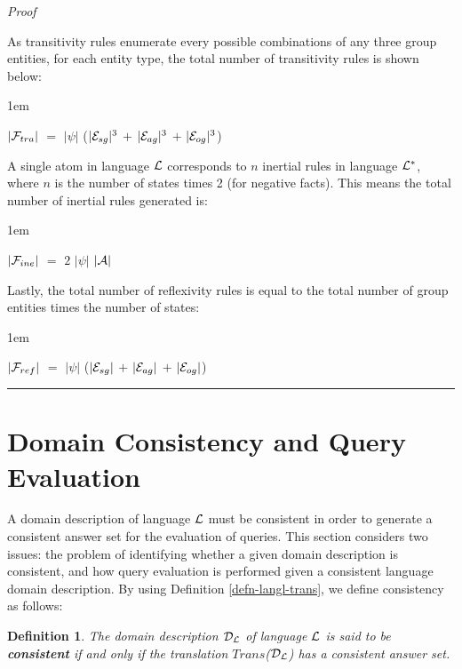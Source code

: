 \documentclass[11pt]{report}
\newtheorem{vdefinition}{Definition}[chapter]
\newenvironment{vproof}
{
  \noindent
  {\em Proof}\hspace{0.5em}
}
{

  \noindent
  \rule{0.5em}{0.5em}
}
\newenvironment{vquote}
{
  \begin{list}{}{\leftmargin 1em}\item[]
}
{
  \end{list}
}
\begin{document}
\begin{vproof}
          As transitivity rules enumerate every possible combinations of any
          three group entities, for each entity type, the total number of
          transitivity rules is shown below:

          \begin{vquote}
            $|{\cal F}_{tra}|$ $=$
            $|\psi|$
            ($|{\cal E}_{sg}|^{3}$ $+$ $|{\cal E}_{ag}|^{3}$ $+$ $|{\cal E}_{og}|^{3}$)
          \end{vquote}

          A single atom in language ${\cal L}$ corresponds to $n$ inertial
          rules in language ${\cal L}^{*}$, where $n$ is the number of states
          times 2 (for negative facts). This means the total number of
          inertial rules generated is:

          \begin{vquote}
            $|{\cal F}_{ine}|$ $=$ $2$ $|\psi|$ $|{\cal A}|$
          \end{vquote}

          Lastly, the total number of reflexivity rules is equal to the total
          number of group entities times the number of states:

          \begin{vquote}
            $|{\cal F}_{ref}|$ $=$
            $|\psi|$
            ($|{\cal E}_{sg}|$ $+$ $|{\cal E}_{ag}|$ $+$ $|{\cal E}_{og}|$)
          \end{vquote}
        \end{vproof}

    \section{Domain Consistency and Query Evaluation}
      \label{sect-langl-consi}

      A domain description of language ${\cal L}$ must be consistent in order
      to generate a consistent answer set for the evaluation of queries. This
      section considers two issues: the problem of identifying whether a given
      domain description is consistent, and how query evaluation is performed
      given a consistent language domain description. By using Definition
      \ref{defn-langl-trans}, we define consistency as follows:

      \begin{vdefinition}
        \label{defn-langl-consi}
        The domain description ${\cal D_L}$ of language ${\cal L}$ is said to
        be {\bf consistent} if and only if the translation
        $Trans$(${\cal D_L}$) has a consistent answer set.
      \end{vdefinition}
\end{document}
